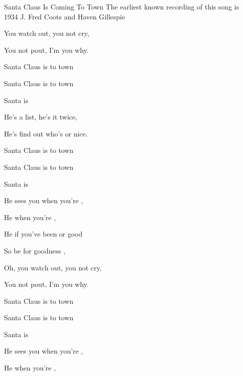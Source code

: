 \begin{SBSong}{Santa Claus Is Coming To Town}
    {The earliest known recording of this song is 1934}
    {J. Fred Coots and Haven Gillespie}
  \begin{SBVerse}
	You  watch out, you  not cry,

	You  not pout, I'm  you why.

	 Santa Claus is  to town

	 Santa Claus is  to town

	 Santa  is    
  \end{SBVerse}
  \begin{SBVerse}
	He's  a list, he's  it twice,

	He's  find out who's  or nice.

	 Santa Claus is  to town

	 Santa Claus is  to town

	 Santa  is   
  \end{SBVerse}
  \begin{SBVerse}
	He sees you when you're ,

	He  when you're ,

	He  if you've been  or good

	So be  for goodness ,
  \end{SBVerse}
  \WBPageBrk
  \begin{SBVerse}
	Oh, you  watch out, you  not cry,

	You  not pout, I'm  you why.

	 Santa Claus is  to town

	 Santa Claus is  to town

	 Santa  is   
  \end{SBVerse}
  \CBPageBrk
  \begin{SBVerse}
	He sees you when you're ,

	He  when you're ,


\end{SBVerse}
\end{SBSong}
